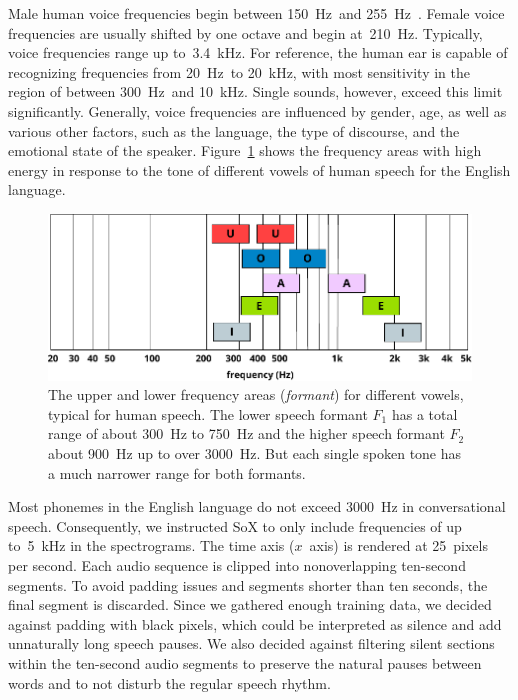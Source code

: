 	Male human voice frequencies begin between \SI{150}{\hertz}~and \SI{255}{\hertz}~\cite{traunmuller1993frequency}. Female voice frequencies are usually shifted by one octave and begin at~\SI{210}{\hertz}. Typically, voice frequencies range up to~\SI{3.4}{\kilo\hertz}. For reference, the human ear is capable of recognizing frequencies from \SI{20}{\hertz}~to \SI{20}{\kilo\hertz}, with most sensitivity in the region of between \SI{300}{\hertz}~and \SI{10}{\kilo\hertz}. Single sounds, however, exceed this limit significantly. Generally, voice frequencies are influenced by gender, age, as well as various other factors, such as the language, the type of discourse, and the emotional state of the speaker. Figure~\ref{img:frequencies} shows the frequency areas with high energy in response to the tone of different vowels of human speech for the English language.
%
	\begin{figure}[tp]
  		\centering
    	\includegraphics{img/frequencies.pdf}
    	\caption{The upper and lower frequency areas (\emph{formant}) for different vowels, typical for human speech. The lower speech formant $F_1$ has a total range of about \SI{300}{\hertz} to \SI{750}{\hertz} and the higher speech formant $F_2$ about \SI{900}{\hertz} up to over \SI{3000}{\hertz}. But each single spoken tone has a much narrower range for both formants.}
    	\label{img:frequencies}
	\end{figure}
%

Most phonemes in the English language do not exceed \SI{3000}{\hertz} in conversational speech.
Consequently, we instructed SoX to only include frequencies of up to~\SI{5}{\kilo\hertz} in the spectrograms.
The time axis ($x$~axis) is rendered at \num{25}~pixels per second. Each audio sequence is clipped into nonoverlapping ten-second segments. To avoid padding issues and segments shorter than ten seconds, the final segment is discarded. Since we gathered enough training data, we decided against padding with black pixels, which could be interpreted as silence and add unnaturally long speech pauses. We also decided against filtering silent sections within the ten-second audio segments to preserve the natural pauses between words and to not disturb the regular speech rhythm. 


